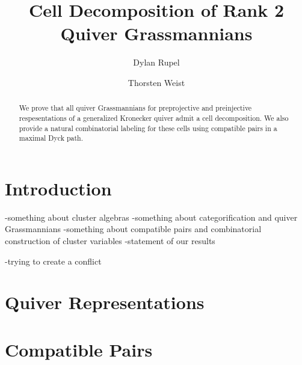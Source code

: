 \documentclass{amsart}
\author{Dylan Rupel}
\author{Thorsten Weist}
\title{Cell Decomposition of Rank 2 Quiver Grassmannians}
\begin{document}
\begin{abstract}
  We prove that all quiver Grassmannians for preprojective and preinjective respesentations of a generalized Kronecker quiver admit a cell decomposition.  
  We also provide a natural combinatorial labeling for these cells using compatible pairs in a maximal Dyck path. 
\end{abstract}
\maketitle

\section{Introduction}
-something about cluster algebras
-something about categorification and quiver Grassmannians
-something about compatible pairs and combinatorial construction of cluster variables
-statement of our results

-trying to create a conflict
\section{Quiver Representations}

\section{Compatible Pairs}
\end{document}
